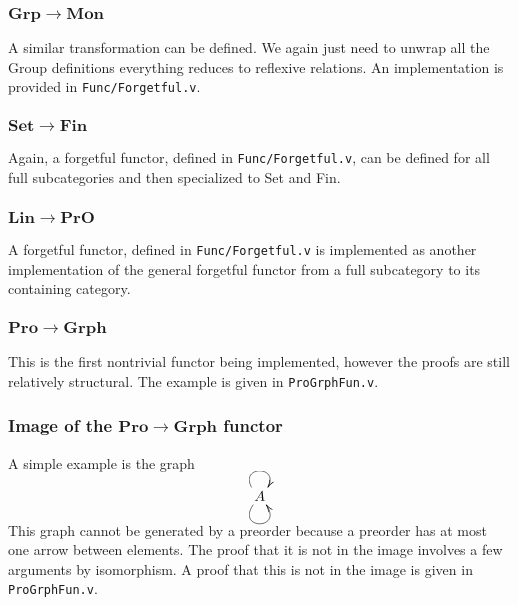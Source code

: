 \documentclass[12pt,twocolumn,oneside]{book}
\begin{document}
\subsubsection{$\mathbf{Grp} \to \mathbf{Mon}$}

A similar transformation can be defined. We again just need to unwrap all the Group
definitions everything reduces to reflexive relations. An implementation is provided
in \texttt{Func/Forgetful.v}.


\subsubsection{$\mathbf{Set} \to \mathbf{Fin}$}

Again, a forgetful functor, defined in \texttt{Func/Forgetful.v}, can be defined for all full
subcategories and then specialized to Set and Fin.

\subsubsection{$\mathbf{Lin} \to \mathbf{PrO}$}

A forgetful functor, defined in \texttt{Func/Forgetful.v} is implemented as another
implementation of the general forgetful functor from a full subcategory to its
containing category.

\subsubsection{$\mathbf{Pro} \to \mathbf{Grph}$}

This is the first nontrivial functor being implemented, however the proofs are
still relatively structural. The example is given in \texttt{ProGrphFun.v}.

\subsubsection{Image of the $\mathbf{Pro} \to \mathbf{Grph}$ functor}

A simple example is the graph

\begin{displaymath}
    \xymatrix{
         A \ar@(ul,ur) \ar@(dl,dr) }
\end{displaymath}

This graph cannot be generated by a preorder because a preorder has at most one arrow
between elements. The proof that it is not in the image involves a few arguments by
isomorphism. A proof that this is not in the image is given in \texttt{ProGrphFun.v}.
\end{document}
